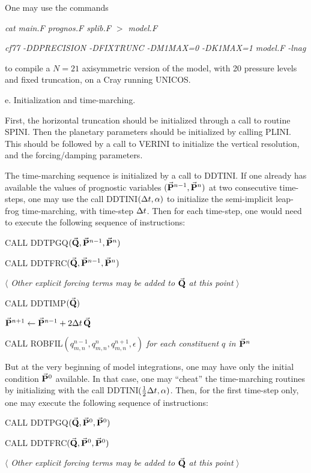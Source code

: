 \noindent One may use the commands
 
{\sl cat main.F prognos.F splib.F $>$ model.F}
 
{\sl cf77 -DDPRECISION -DFIXTRUNC -DM1MAX=0 -DK1MAX=1 model.F -lnag}
 
to compile a $N=21$ axisymmetric version of the model, with 20 pressure levels
and fixed truncation, on a Cray running UNICOS.
 
 
\Subsection e. Initialization and time-marching.
 
First, the horizontal truncation should be initialized through a call to
routine SPINI. Then the planetary parameters should be initialized by calling
PLINI. This should be followed by a call to VERINI to initialize the vertical
resolution, and the forcing/damping parameters.
 
The time-marching sequence is initialized by a call to DDTINI. If one already
has available the values of prognostic variables $({\vec {{\bf P}}}^{n-1},{\vec
{{\bf P}}}^n)$ at two consecutive time-steps, one may use the call
DDTINI$({\Delta t},\alpha)$ to initialize the semi-implicit leap-frog time-marching,
with time-step ${\Delta t}$.  Then for each time-step, one would need to execute the
following sequence of instructions:
 
CALL DDTPGQ$({\vec {{\bf Q}}}, {\vec {{\bf P}}}^{n-1}, {\vec {{\bf P}}}^n)$
 
CALL DDTFRC$({\vec {{\bf Q}}}, {\vec {{\bf P}}}^{n-1}, {\vec {{\bf P}}}^n)$
 
$\langle$ {\sl Other explicit forcing terms may be added to ${\vec {{\bf Q}}}$ at
this point} $\rangle$
 
CALL DDTIMP$({\vec {{\bf Q}}})$
 
${\vec {{\bf P}}}^{n+1} \gets {\vec {{\bf P}}}^{n-1} + 2{\Delta t}\, {\vec {{\bf Q}}}$
 
CALL ROBFIL$(q_{m,n}^{n-1},q_{m,n}^n,q_{m,n}^{n+1},\epsilon)$ {\sl for each
constituent $q$ in ${\vec {{\bf P}}}^n$ }
 
But at the very beginning of model integrations, one may have only the initial
condition ${\vec {{\bf P}}}^0$ available. In that case, one may ``cheat'' the
time-marching routines by initializing with the call
DDTINI$({1 \over 2}{\Delta t},\alpha)$. Then, for the first time-step only, one may execute
the following sequence of instructions:
 
CALL DDTPGQ$({\vec {{\bf Q}}}, {\vec {{\bf P}}}^0, {\vec {{\bf P}}}^0)$
 
CALL DDTFRC$({\vec {{\bf Q}}}, {\vec {{\bf P}}}^0, {\vec {{\bf P}}}^0)$
 
$\langle$ {\sl Other explicit forcing terms may be added to ${\vec {{\bf Q}}}$ at
this point} $\rangle$
 
